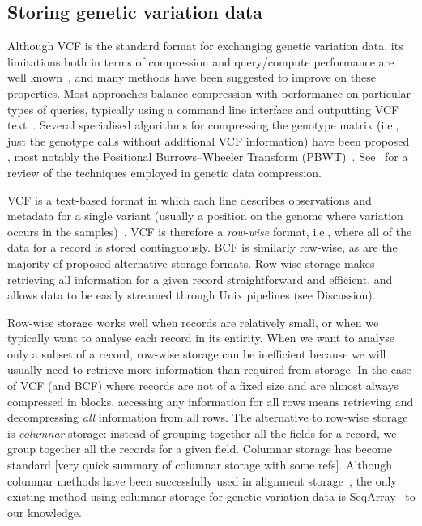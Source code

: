 \documentclass[a4paper,num-refs]{oup-contemporary}
\begin{document}
\subsection{Storing genetic variation data}
Although VCF is the standard format for exchanging genetic variation
data, its limitations both in terms of compression 
and query/compute performance are well 
known~\citep[e.g.][]{kelleher2013processing,layer2016efficient,li2016bgt},
and many methods 
have been suggested to improve on these properties.
Most approaches balance compression with
performance on particular types of queries, 
typically using a command line interface
and outputting VCF text~\citep{
layer2016efficient, %
li2016bgt, %
tatwawadi2016gtrac, %
danek2018gtc, %
lin2020sparse, %
lan2020genozip,lan2021genozip, %
lefaive2021sparse, %
wertenbroek2022xsi,%
zhang2023gbc}. %
Several specialised algorithms for compressing 
the genotype matrix (i.e., just the genotype calls without additional
VCF information) have been proposed
\citep{deorowicz2013genome, %
deorowicz2019gtshark, %
deorowicz2021vcfshark}, %
most notably the Positional
Burrows--Wheeler Transform (PBWT)~\citep{durbin2014efficient}.
See~\citep{mcvean2019linkage} for a review of the techniques
employed in genetic data compression.

VCF is a text-based format in which each line
describes observations
and metadata for a single variant (usually a position on the genome
where variation occurs in the samples)~\citep{danecek2011variant}. 
VCF is therefore a \emph{row-wise} format, i.e., where all of the 
data for a record is stored continguously. BCF is similarly 
row-wise, as are the majority of proposed alternative storage formats.
Row-wise storage makes retrieving all information
for a given record straightforward and efficient, and 
allows data to be easily streamed through Unix pipelines (see Discussion).

Row-wise storage works well when records are relatively small, 
or when we typically want to analyse each record in its entirity.
When we want to analyse only a subset of a record,
row-wise storage can be inefficient because we will usually need to
retrieve more information than required from storage. In the case 
of VCF (and BCF) where records are not of a fixed size and 
are almost always compressed in blocks, accessing any information
for all rows means retrieving and decompressing \emph{all} 
information from all rows.
The alternative to row-wise storage is \emph{columnar} storage:
instead of grouping together all the fields for a record,
we group together all the records for a given field.
Columnar storage has become standard [very quick summary of columnar
storage with some refs].
Although columnar methods have been successfully used in alignment 
storage~\citep{bonfield2014scramble,bonfield2022cram},
the only existing method using columnar 
storage for genetic variation data is 
SeqArray~\citep{zheng2017seqarray,zheng2012high} to our knowledge.
\end{document}
